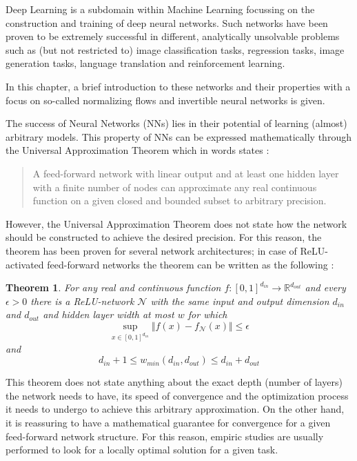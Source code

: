 \label{sec:deeplearning}

Deep Learning is a subdomain within Machine Learning focussing on the construction and training of deep neural networks. Such networks have been proven to be extremely successful in different, analytically unsolvable problems such as (but not restricted to) image classification tasks, regression tasks, image generation tasks, language translation and reinforcement learning.

In this chapter, a brief introduction to these networks and their properties with a focus on so-called normalizing flows and invertible neural networks is given.


The success of Neural Networks (NNs) lies in their potential of learning (almost) arbitrary models. This property of NNs can be expressed mathematically through the Universal Approximation Theorem which in words states \cite{DLiPR}:

\begin{quote}
	\centering
	A feed-forward network with linear output and at least one hidden layer with a finite number of nodes can approximate any real continuous function on a given closed and bounded subset to arbitrary precision.
\end{quote}

However, the Universal Approximation Theorem does not state how the network should be constructed to achieve the desired precision. For this reason, the theorem has been proven for several network architectures; in case of ReLU-activated feed-forward networks the theorem can be written as the following \cite{UAC}:
\newtheorem{theorem}{Theorem}
\begin{theorem}
	For any real and continuous function $f : [0, 1]^{d_{in}} \rightarrow \mathbb{R}^{d_{out}}$ and every $\epsilon>0$ there is a ReLU-network $\mathcal{N}$ with the same input and output dimension $d_{in}$ and $d_{out}$ and hidden layer width at most $w$ for which
	\begin{equation*}
		\sup_{x\in[0, 1]^{d_{in}}}\Vert f(x)-f_\mathcal{N}(x)\Vert \leq \epsilon
	\end{equation*}
	and
	\begin{equation*}
		d_{in} + 1 \leq w_{min}(d_{in}, d_{out}) \leq d_{in} + d_{out}
	\end{equation*}
\end{theorem}
This theorem does not state anything about the exact depth (number of layers) the network needs to have, its speed of convergence and the optimization process it needs to undergo to achieve this arbitrary approximation. On the other hand, it is reassuring to have a mathematical guarantee for convergence for a given feed-forward network structure. For this reason, empiric studies are usually performed to look for a locally optimal solution for a given task.

